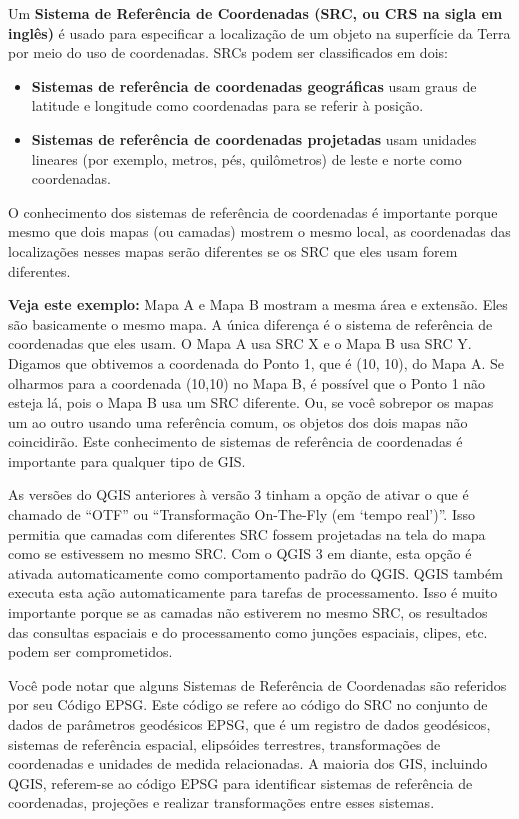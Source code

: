\documentclass[
  portuguese,
]{krantz}
\providecommand{\tightlist}{%
  \setlength{\itemsep}{0pt}\setlength{\parskip}{0pt}}
\begin{document}
Um \textbf{Sistema de Referência de Coordenadas (SRC, ou CRS na sigla em inglês)} é usado para especificar a localização de um objeto na superfície da Terra por meio do uso de coordenadas. SRCs podem ser classificados em dois:

\begin{itemize}
\tightlist
\item
  \textbf{Sistemas de referência de coordenadas geográficas} usam graus de latitude e longitude como coordenadas para se referir à posição.
\item
  \textbf{Sistemas de referência de coordenadas projetadas} usam unidades lineares (por exemplo, metros, pés, quilômetros) de leste e norte como coordenadas.
\end{itemize}

O conhecimento dos sistemas de referência de coordenadas é importante porque mesmo que dois mapas (ou camadas) mostrem o mesmo local, as coordenadas das localizações nesses mapas serão diferentes se os SRC que eles usam forem diferentes.

\textbf{Veja este exemplo:} Mapa A e Mapa B mostram a mesma área e extensão. Eles são basicamente o mesmo mapa. A única diferença é o sistema de referência de coordenadas que eles usam. O Mapa A usa SRC X e o Mapa B usa SRC Y. Digamos que obtivemos a coordenada do Ponto 1, que é (10, 10), do Mapa A. Se olharmos para a coordenada (10,10) no Mapa B, é possível que o Ponto 1 não esteja lá, pois o Mapa B usa um SRC diferente. Ou, se você sobrepor os mapas um ao outro usando uma referência comum, os objetos dos dois mapas não coincidirão. Este conhecimento de sistemas de referência de coordenadas é importante para qualquer tipo de GIS.

As versões do QGIS anteriores à versão 3 tinham a opção de ativar o que é chamado de ``OTF'' ou ``Transformação On-The-Fly (em `tempo real')''. Isso permitia que camadas com diferentes SRC fossem projetadas na tela do mapa como se estivessem no mesmo SRC. Com o QGIS 3 em diante, esta opção é ativada automaticamente como comportamento padrão do QGIS. QGIS também executa esta ação automaticamente para tarefas de processamento. Isso é muito importante porque se as camadas não estiverem no mesmo SRC, os resultados das consultas espaciais e do processamento como junções espaciais, clipes, etc. podem ser comprometidos.

Você pode notar que alguns Sistemas de Referência de Coordenadas são referidos por seu Código EPSG. Este código se refere ao código do SRC no conjunto de dados de parâmetros geodésicos EPSG, que é um registro de dados geodésicos, sistemas de referência espacial, elipsóides terrestres, transformações de coordenadas e unidades de medida relacionadas. A maioria dos GIS, incluindo QGIS, referem-se ao código EPSG para identificar sistemas de referência de coordenadas, projeções e realizar transformações entre esses sistemas.
\end{document}
